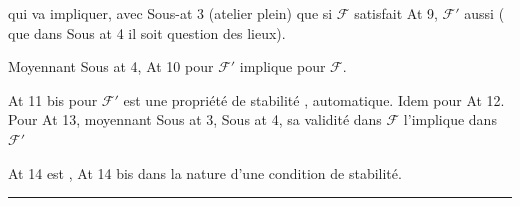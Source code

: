 
qui va impliquer,  avec Sous-at 3 (atelier plein) que si $\mathcal F$ satisfait At 9, $\mathcal F'$ aussi ( que dans Sous at 4 il soit question des lieux).

Moyennant Sous at 4,   At 10 pour $\mathcal F'$ implique   pour $\mathcal F$.

At 11 bis  pour $\mathcal F'$ est une propriété de stabilité ,  automatique. Idem pour At 12. Pour At 13,  moyennant Sous at 3, Sous at 4, sa validité dans $\mathcal F$ l'implique dans $\mathcal F'$

At 14 est , At 14 bis dans la nature d'une condition de stabilité.

\begin{center}
\rule{1.35em}{0.4pt}
\end{center}
